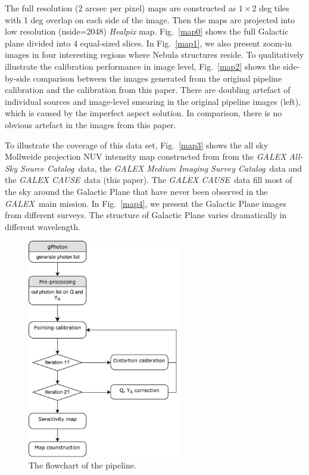 \documentclass[12pt, preprint]{aastex}
\newcommand{\project}[1]{\textsl{#1}}
\newcommand{\galex}{\project{GALEX}}
\newcommand{\asc}{\project{GALEX All-Sky Source Catalog}}
\newcommand{\msc}{\project{GALEX Medium Imaging Survey Catalog}}
\newcommand{\cause}{\project{GALEX CAUSE}}
\begin{document}
The full resolution (2 arcsec per pixel) maps are constructed   as $1 \times 2$ deg tiles with 1 deg overlap on each side of the image.
Then the maps are projected into low resolution (nside=2048) \project{Healpix} map.
Fig.~\ref{map0} shows the full Galactic plane divided into 4 equal-sized slices.
In Fig.~\ref{map1}, we also present zoom-in images in four interesting regions where Nebula structures reside.
To qualitatively illustrate the calibration performance in image level, Fig.~\ref{map2} shows the side-by-side comparison between the images generated from the original pipeline calibration and the calibration from this paper.
There are doubling artefact of individual sources and image-level smearing in the original pipeline images (left), which is caused by the imperfect aspect solution.
In comparison, there is no obvious artefact in the images from this paper.

To illustrate the coverage of this data set, Fig.~\ref{map3} shows the all sky Mollweide projection NUV intensity map constructed from from the \asc\ data, the \msc\ data and the \cause\ data (this paper).
The \cause\ data fill most of the sky around the Galactic Plane that have never been observed in the \galex\ main mission.
In Fig.~\ref{map4}, we present the Galactic Plane images from different surveys. 
The structure of Galactic Plane varies dramatically in different wavelength.
\begin{figure}[p]
\begin{center}
\includegraphics[width=0.6\textwidth]{figures/flowchart}
\end{center}
\caption{
  \label{flowchart}
  The flowchart of the pipeline.
}
\end{figure}
\end{document}
